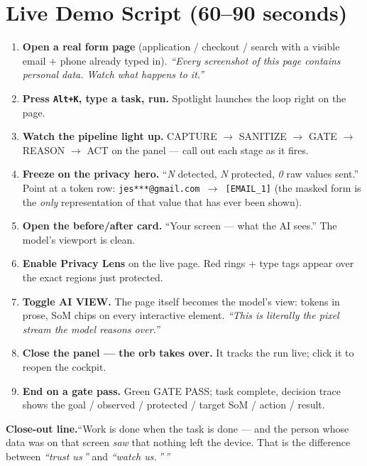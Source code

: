 \documentclass[11pt,a4paper]{article}
\newcommand{\kbd}[1]{\texttt{\small #1}}
\begin{document}
\section{Live Demo Script (60--90 seconds)}

\begin{enumerate}[leftmargin=20pt]
  \item \textbf{Open a real form page} (application / checkout / search with a
        visible email + phone already typed in).
        \emph{``Every screenshot of this page contains personal data. Watch
        what happens to it.''}
  \item \textbf{Press \kbd{Alt+K}, type a task, run.} Spotlight launches the
        loop right on the page.
  \item \textbf{Watch the pipeline light up.} \textsc{CAPTURE
        $\rightarrow$ SANITIZE $\rightarrow$ GATE $\rightarrow$ REASON
        $\rightarrow$ ACT} on the panel --- call out each stage as it fires.
  \item \textbf{Freeze on the privacy hero.} ``\emph{N} detected,
        \emph{N} protected, \emph{0} raw values sent.'' Point at a token row:
        \texttt{jes***@gmail.com $\rightarrow$ [EMAIL\_1]} (the masked form is
        the \emph{only} representation of that value that has ever been shown).
  \item \textbf{Open the before/after card.} ``Your screen --- what the AI
        sees.'' The model's viewport is clean.
  \item \textbf{Enable Privacy Lens} on the live page. Red rings + type tags
        appear over the exact regions just protected.
  \item \textbf{Toggle \textsc{AI VIEW}.} The page itself becomes the model's
        view: tokens in prose, SoM chips on every interactive element.
        \emph{``This is literally the pixel stream the model reasons over.''}
  \item \textbf{Close the panel --- the orb takes over.} It tracks the run live;
        click it to reopen the cockpit.
  \item \textbf{End on a gate pass.} Green \textsc{GATE PASS}; task complete,
        decision trace shows the goal / observed / protected / target SoM /
        action / result.
\end{enumerate}

\begin{voxbox}
\textbf{Close-out line.}\quad ``Work is done when the task is done --- and
the person whose data was on that screen \emph{saw} that nothing left the
device. That is the difference between \emph{``trust us\,''} and
\emph{``watch us.\,''\,''}
\end{voxbox}
\end{document}
